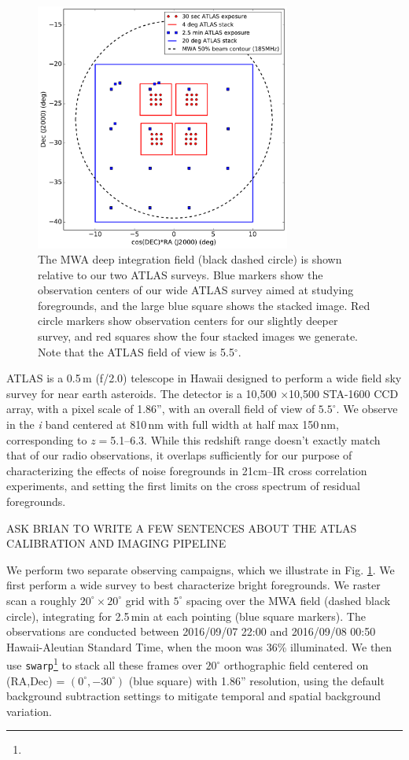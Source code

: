 \documentclass{emulateapj}
\begin{document}
\begin{figure}[h]
\centering
\includegraphics[width=3.3in]{images/survey_overview.pdf}
\caption{The MWA deep integration field (black dashed circle) is shown relative to our two ATLAS surveys. Blue markers show the observation centers of our wide ATLAS survey aimed at studying foregrounds, and the large blue square shows the stacked image. Red circle markers show observation centers for our slightly deeper survey, and red squares show the four stacked images we generate. Note that the ATLAS field of view is 5.5$^\circ$.}
\label{fig:surveyoverview}
\end{figure}

ATLAS is a 0.5\,m (f/2.0) telescope \citep{tonry11} in Hawaii designed to perform a wide field sky survey for near earth asteroids. The detector is a 10,500 $\times$10,500 STA-1600 CCD array, with a pixel scale of 1.86'', with an overall field of view of $5.5^\circ$. We observe in the \textit{i} band centered at 810\,nm with full width at half max 150\,nm, corresponding to $z=$5.1--6.3. While this redshift range doesn't exactly match that of our radio observations, it overlaps sufficiently for our purpose of characterizing the effects of noise foregrounds in 21cm--IR cross correlation experiments, and setting the first limits on the cross spectrum of residual foregrounds. 

ASK BRIAN TO WRITE A FEW SENTENCES ABOUT THE ATLAS CALIBRATION AND IMAGING PIPELINE

We perform two separate observing campaigns, which we illustrate in Fig. \ref{fig:surveyoverview}. We first perform a wide survey to best characterize bright foregrounds. We raster scan a roughly $20^\circ\times20^\circ$ grid with $5^\circ$ spacing over the MWA field (dashed black circle), integrating for 2.5\,min at each pointing (blue square markers). The observations are conducted between 2016/09/07 22:00  and 2016/09/08 00:50 Hawaii-Aleutian Standard Time, when the moon was 36\% illuminated. We then use {\tt swarp}\footnote{} \citep{swarp} to stack all these frames over $20^\circ$ orthographic field centered on (RA,Dec) = $(0^\circ,-30^\circ)$ (blue square) with 1.86'' resolution, using the default background subtraction settings to mitigate temporal and spatial background variation. 
\end{document}
